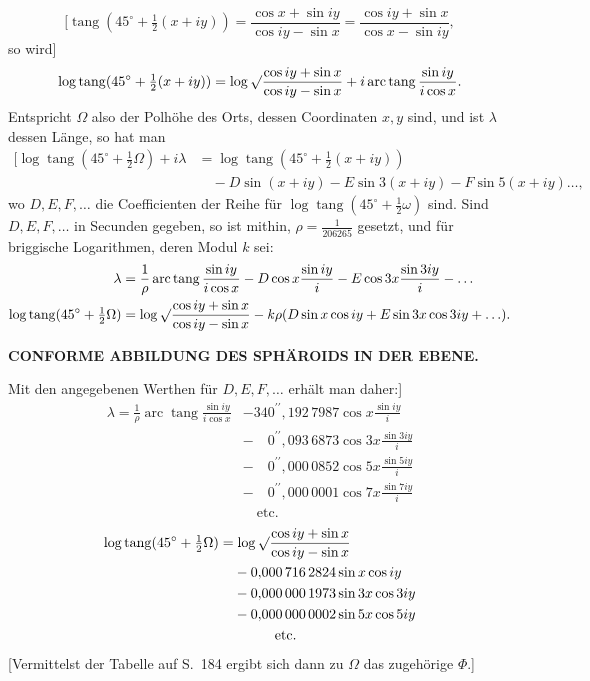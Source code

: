\[
[\operatorname{tang}(45^\circ+\tfrac12(x+iy))=
\frac{\cos x+\sin iy}{\cos iy-\sin x}=
\frac{\cos iy+\sin x}{\cos x-\sin iy},
\]
\noindent so wird]
\[
\log\operatorname{tang}(45^\circ+\tfrac12(x+iy))
=\log\surd\frac{\cos iy+\sin x}{\cos iy-\sin x}
+i\operatorname{arc}\operatorname{tang}\frac{\sin iy}{i\cos x}.
\]
Entspricht \(\Omega\) also der Polhöhe des Orts, dessen Coordinaten \(x,y\) sind,
und ist \(\lambda\) dessen Länge, so hat man
\[
\begin{aligned}
\mathopen{[}\log\operatorname{tang}(45^\circ+\tfrac12\Omega)+i\lambda
  &=\log\operatorname{tang}(45^\circ+\tfrac12(x+iy))\\
  &\quad-D\sin(x+iy)-E\sin3(x+iy)-F\sin5(x+iy)\ldots,
\end{aligned}
\]
\noindent wo \(D,E,F,\ldots\) die Coefficienten der Reihe für
\(\log\operatorname{tang}(45^\circ+\tfrac12\omega)\) sind. Sind \(D,E,F,\ldots\)
in Secunden gegeben, so ist mithin, \(\rho=\tfrac{1}{206265}\) gesetzt, und für
briggische Logarithmen, deren Modul \(k\) sei:
\[
\begin{aligned}
\lambda&=\frac1\rho\operatorname{arc}\operatorname{tang}\frac{\sin iy}{i\cos x}
-D\cos x\frac{\sin iy}{i}-E\cos3x\frac{\sin3iy}{i}-\ldots\\
\log\operatorname{tang}(45^\circ+\tfrac12\Omega)
&=\log\surd\frac{\cos iy+\sin x}{\cos iy-\sin x}
-k\rho(D\sin x\cos iy+E\sin3x\cos3iy+\ldots).
\end{aligned}
\]

\par\clearpage
\noindent\null\hfill{\small\textbf{CONFORME ABBILDUNG DES SPHÄROIDS IN DER EBENE.}}\hfill{}\par\medskip

Mit den angegebenen Werthen für \(D,E,F,\ldots\) erhält man daher:]
\[
\begin{aligned}
\lambda=\frac1\rho\operatorname{arc}\operatorname{tang}\frac{\sin iy}{i\cos x}
&-340^{\prime\prime}{,}192\,7987\cos x\frac{\sin iy}{i}\\
&-\phantom{34}0^{\prime\prime}{,}093\,6873\cos3x\frac{\sin3iy}{i}\\
&-\phantom{34}0^{\prime\prime}{,}000\,0852\cos5x\frac{\sin5iy}{i}\\
&-\phantom{34}0^{\prime\prime}{,}000\,0001\cos7x\frac{\sin7iy}{i}\\
&\quad\text{etc.}
\end{aligned}
\]
\[
\begin{aligned}
\log\operatorname{tang}(45^\circ+\tfrac12\Omega)
&=\log\surd\frac{\cos iy+\sin x}{\cos iy-\sin x}\\
&\phantom{={}}-0{,}000\,716\,2824\sin x\cos iy\\
&\phantom{={}}-0{,}000\,000\,1973\sin3x\cos3iy\\
&\phantom{={}}-0{,}000\,000\,0002\sin5x\cos5iy\\
&\qquad\qquad\text{etc.}
\end{aligned}
\]
[Vermittelst der Tabelle auf S.\ 184 ergibt sich dann zu \(\Omega\) das zugehörige \(\Phi\).]

